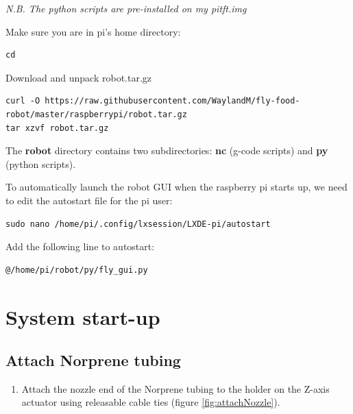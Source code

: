 \documentclass[
]{book}
\providecommand{\tightlist}{%
  \setlength{\itemsep}{0pt}\setlength{\parskip}{0pt}}
\begin{document}
\emph{N.B. The python scripts are pre-installed on my pitft.img}

Make sure you are in pi's home directory:

\begin{verbatim}
cd
\end{verbatim}

Download and unpack robot.tar.gz

\begin{verbatim}
curl -O https://raw.githubusercontent.com/WaylandM/fly-food-robot/master/raspberrypi/robot.tar.gz
tar xzvf robot.tar.gz
\end{verbatim}

The \textbf{robot} directory contains two subdirectories: \textbf{nc} (g-code scripts) and \textbf{py} (python scripts).

To automatically launch the robot GUI when the raspberry pi starts up, we need to edit the autostart file for the pi user:

\begin{verbatim}
sudo nano /home/pi/.config/lxsession/LXDE-pi/autostart
\end{verbatim}

Add the following line to autostart:

\begin{verbatim}
@/home/pi/robot/py/fly_gui.py
\end{verbatim}

\hypertarget{startup}{%
\chapter{System start-up}\label{startup}}

\hypertarget{attach-norprene-tubing}{%
\section{Attach Norprene tubing}\label{attach-norprene-tubing}}

\begin{enumerate}
\def\labelenumi{\arabic{enumi}.}
\tightlist
\item
  Attach the nozzle end of the Norprene tubing to the holder on the Z-axis actuator using releasable cable ties (figure \ref{fig:attachNozzle}).
\end{enumerate}
\end{document}
